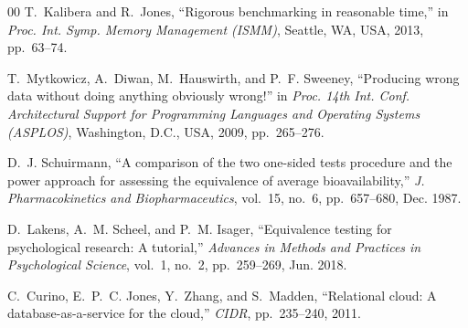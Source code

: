 \documentclass[conference]{IEEEtran}
\begin{document}
\begin{thebibliography}{00}
T.~Kalibera and R.~Jones, ``Rigorous benchmarking in reasonable time,'' in \emph{Proc. Int. Symp. Memory Management (ISMM)}, Seattle, WA, USA, 2013, pp.~63--74.

T.~Mytkowicz, A.~Diwan, M.~Hauswirth, and P.~F. Sweeney, ``Producing wrong data without doing anything obviously wrong!'' in \emph{Proc. 14th Int. Conf. Architectural Support for Programming Languages and Operating Systems (ASPLOS)}, Washington, D.C., USA, 2009, pp.~265--276.

D.~J. Schuirmann, ``A comparison of the two one-sided tests procedure and the power approach for assessing the equivalence of average bioavailability,'' \emph{J. Pharmacokinetics and Biopharmaceutics}, vol.~15, no.~6, pp.~657--680, Dec. 1987.

D.~Lakens, A.~M. Scheel, and P.~M. Isager, ``Equivalence testing for psychological research: A tutorial,'' \emph{Advances in Methods and Practices in Psychological Science}, vol.~1, no.~2, pp.~259--269, Jun. 2018.

C.~Curino, E.~P.~C. Jones, Y.~Zhang, and S.~Madden, ``Relational cloud: A database-as-a-service for the cloud,'' \emph{CIDR}, pp.~235--240, 2011.

\end{thebibliography}
\end{document}
